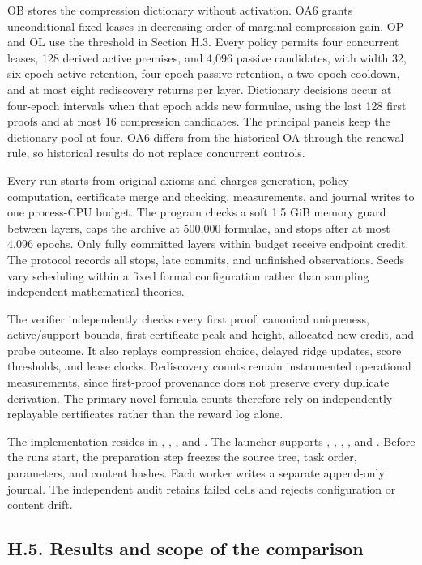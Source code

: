 \documentclass[pdflatex,sn-basic,Numbered]{sn-jnl}
\begin{document}
OB stores the compression dictionary without activation. OA6 grants unconditional fixed leases in decreasing order of marginal compression gain. OP and OL use the threshold in Section H.3. Every policy permits four concurrent leases, 128 derived active premises, and 4,096 passive candidates, with width 32, six-epoch active retention, four-epoch passive retention, a two-epoch cooldown, and at most eight rediscovery returns per layer. Dictionary decisions occur at four-epoch intervals when that epoch adds new formulae, using the last 128 first proofs and at most 16 compression candidates. The principal panels keep the dictionary pool at four. OA6 differs from the historical OA through the renewal rule, so historical results do not replace concurrent controls.

Every run starts from original axioms and charges generation, policy computation, certificate merge and checking, measurements, and journal writes to one process-CPU budget. The program checks a soft 1.5 GiB memory guard between layers, caps the archive at 500,000 formulae, and stops after at most 4,096 epochs. Only fully committed layers within budget receive endpoint credit. The protocol records all stops, late commits, and unfinished observations. Seeds vary scheduling within a fixed formal configuration rather than sampling independent mathematical theories.

The verifier independently checks every first proof, canonical uniqueness, active/support bounds, first-certificate peak and height, allocated new credit, and probe outcome. It also replays compression choice, delayed ridge updates, score thresholds, and lease clocks. Rediscovery counts remain instrumented operational measurements, since first-proof provenance does not preserve every duplicate derivation. The primary novel-formula counts therefore rely on independently replayable certificates rather than the reward log alone.

The implementation resides in , , , and . The launcher  supports , , , , and . Before the runs start, the preparation step freezes the source tree, task order, parameters, and content hashes. Each worker writes a separate append-only journal. The independent audit retains failed cells and rejects configuration or content drift.

\subsection*{H.5. Results and scope of the comparison}\label{h.5.-results-and-scope-of-the-comparison}
\end{document}
